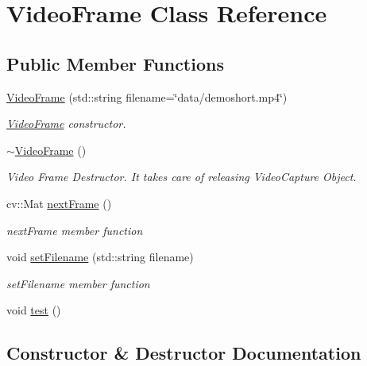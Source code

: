 \hypertarget{class_video_frame}{}\section{Video\+Frame Class Reference}
\label{class_video_frame}
\subsection*{Public Member Functions}
\begin{DoxyCompactItemize}
\item 
\hyperlink{class_video_frame_ac9e26827d8d273650cdc234ec9f90465}{Video\+Frame} (std\+::string filename=\char`\"{}data/demoshort.\+mp4\char`\"{})
\begin{DoxyCompactList}\small\item\em \hyperlink{class_video_frame}{Video\+Frame} constructor. \end{DoxyCompactList}\item 
\hyperlink{class_video_frame_af3b566c39ee5878c602581cb1f196675}{$\sim$\+Video\+Frame} ()\hypertarget{class_video_frame_af3b566c39ee5878c602581cb1f196675}{}\label{class_video_frame_af3b566c39ee5878c602581cb1f196675}

\begin{DoxyCompactList}\small\item\em Video Frame Destructor. It takes care of releasing Video\+Capture Object. \end{DoxyCompactList}\item 
cv\+::\+Mat \hyperlink{class_video_frame_ad419c1a5d02f947b65f8ad8b553ccc07}{next\+Frame} ()
\begin{DoxyCompactList}\small\item\em next\+Frame member function \end{DoxyCompactList}\item 
void \hyperlink{class_video_frame_a8c05dabf91cafa5d8d76433fd4c94d1e}{set\+Filename} (std\+::string filename)
\begin{DoxyCompactList}\small\item\em set\+Filename member function \end{DoxyCompactList}\item 
void \hyperlink{class_video_frame_acd7155fbf285ed8db0a803f1bacdcf2a}{test} ()
\end{DoxyCompactItemize}


\subsection{Constructor \& Destructor Documentation}
